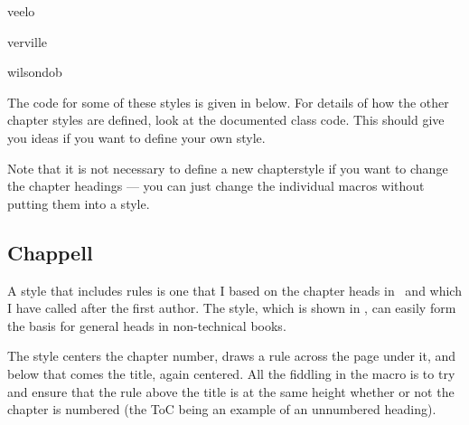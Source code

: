 \begin{demochap*}[-2\onelineskip]{veelo}\end{demochap*}

\begin{demochap}{verville}\end{demochap}

\FloatBlock


\begin{demochap}[-1\onelineskip]{wilsondob}\end{demochap}


The code for some of these styles is given in below.  For details of
how the other chapter styles are defined, look at the documented class
code. This should give you ideas if you want to define your own style.

Note that it is not necessary to define a new chapterstyle if you want
to change the chapter headings --- you can just change the individual
macros without putting them into a style.




\subsection{Chappell}

    A style that includes rules is one that I based on the chapter heads
in~\cite{CHAPPELL99} and which I have called  after the
first author. The style, which is shown in , can easily form
the basis for general heads in non-technical books.
\begin{lcode}
\end{lcode}


The style centers the chapter number, draws a rule across the page under
it, and below that comes the title, again centered. All the fiddling
in the  macro is to try and ensure that the rule
above the title is at the same height whether or not the chapter is numbered
(the ToC being an example of an unnumbered heading).

